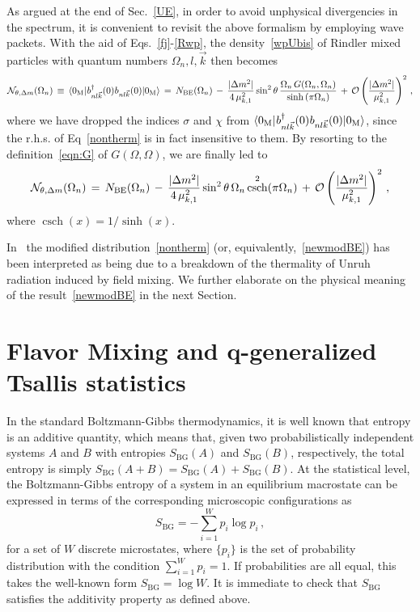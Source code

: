 \documentclass[floats,prd,aps,amssymb,nofootinbib,showkeys]{revtex4}
\DeclareMathOperator{\csch}{csch}
\newcommand{\be}{\begin{equation}}\newcommand{\ee}{\end{equation}}
\begin{document}
As argued at the end of Sec.~\ref{UE}, 
in order to avoid unphysical divergencies in the spectrum, 
it is convenient to revisit the above formalism
by employing wave packets. With the aid
of Eqs.~\eqref{fj}-\eqref{Rwp}, the 
density~\eqref{wpUbis} of Rindler mixed particles 
with quantum numbers $\Omega_n, l, \vec{k}$
then becomes 
\be
\label{ntbis}
\mathcal{N}_{\theta,\Delta m}(\Omega_n)\,\equiv\,\langle0_{\mathrm{M}}|\hspace{0.2mm}b_{nl\vec{k}}^{\dagger}(0)\hspace{0.1mm}b_{nl\vec{k}}(0)|0_{\mathrm{M}}\rangle
\,=\, N_{\mathrm{BE}}({\Omega_n})\,-\,\frac{|\Delta m^2|}{4\,\mu_{k,1}^{\hspace{0.1mm}2}}\sin^2\theta\,\frac{\Omega_{n}\,G(\Omega_n,\Omega_n)}{\sinh\left({\pi}\Omega_n\right)}\,+\,\mathcal{O}\left(\frac{|\Delta m^2|}{\mu^2_{k,1}}\right)^2\,,
\ee
where we have dropped the indices $\sigma$
and $\chi$ from $\langle0_{\mathrm{M}}|\hspace{0.2mm}b_{nl\vec{k}}^{\dagger}(0)\hspace{0.1mm}b_{nl\vec{k}}(0)|0_{\mathrm{M}}\rangle
$, since the r.h.s. of  Eq~\eqref{nontherm}
is in fact insensitive to them. 
By resorting to the definition~\eqref{eqn:G} of $G(\Omega,\Omega)$, 
we are finally led to
\be
\label{newmodBE}
\mathcal{N}_{\theta,\Delta m}(\Omega_n)\,=\, N_{\mathrm{BE}}({\Omega_n})\,-\,\frac{|\Delta m^2|}{4\,\mu_{k,1}^{\hspace{0.1mm}2}}\sin^2\theta\,\Omega_n \csch^2(\pi\Omega_n)\,+\,\mathcal{O}\left(\frac{|\Delta m^2|}{\mu^2_{k,1}}\right)^2\,,
\ee
where $\csch(x)=1/\sinh(x)$. 

In~\cite{Luciano} the modified distribution~\eqref{nontherm} (or, equivalently,~\eqref{newmodBE}) has been interpreted as being due
to a breakdown of the thermality of Unruh radiation 
induced by field mixing. We further elaborate
on the physical meaning of the result~\eqref{newmodBE} in the next Section. 


\section{Flavor Mixing and q-generalized Tsallis statistics}
\label{EDM}
In the standard Boltzmann-Gibbs thermodynamics, 
it is well known that entropy is 
an additive quantity, which means that, given
two probabilistically independent systems $A$ and $B$ with 
entropies $S_{\mathrm{BG}}(A)$ and $S_{\mathrm{BG}}(B)$, respectively, the total entropy is simply $S_{\mathrm{BG}}(A+B)=S_{\mathrm{BG}}(A)+S_{\mathrm{BG}}(B)$. 
At the statistical level, the Boltzmann-Gibbs 
entropy of a system in an equilibrium macrostate
can be expressed in terms of the corresponding
microscopic configurations as
\be
\label{BGent}
S_{\mathrm{BG}}=-\sum_{i=1}^Wp_i\log p_i\,,
\ee
for a set of $W$ discrete microstates, where
$\{p_i\}$ is the set of probability distribution with 
the condition $\sum_{i=1}^{W}p_i=1$. 
If probabilities are all equal, this takes the well-known form $S_{\mathrm{BG}}=\log W$. It is immediate
to check that $S_{\mathrm{BG}}$ satisfies
the additivity property as defined above. 
\end{document}
